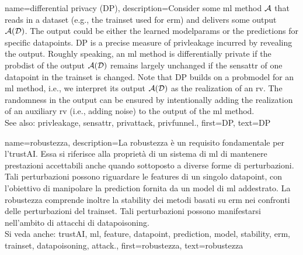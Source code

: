 {name={differential privacy (DP)},
  description={Consider some \gls{ml} method $\mathcal{A}$ 
  	that reads in a \gls{dataset} (e.g., the \gls{trainset} 
  	used for \gls{erm}) and delivers some output $\mathcal{A}(\mathcal{D})$. The output 
  	could be either the learned \glspl{modelparam} or the \glspl{prediction} for specific \glspl{datapoint}. 
  	DP is a precise measure of \gls{privleakage} incurred by revealing the 
  	output. Roughly speaking, an \gls{ml} method is differentially private if the \gls{probdist} 
  	of the output $\mathcal{A}(\mathcal{D})$ remains largely unchanged if the \gls{sensattr} 
  	of one \gls{datapoint} in the \gls{trainset} is changed. Note that DP 
  	builds on a \gls{probmodel} for an \gls{ml} method, i.e., we interpret its output $\mathcal{A}(\mathcal{D})$ 
  	as the \gls{realization} of an \gls{rv}. The randomness in the output can be ensured 
  	by intentionally adding the \gls{realization} of an auxiliary \gls{rv} (i.e., adding noise) to 
  	the output of the \gls{ml} method.
				\\ 
	See also: \gls{privleakage}, \gls{sensattr}, \gls{privattack}, \gls{privfunnel}.}, 
  first={DP}, 
  text={DP} 
}

{name={robustezza},
	description={La robustezza è un requisito fondamentale per l'\gls{trustAI}. Essa si 
	riferisce alla proprietà di un sistema di \gls{ml} di mantenere prestazioni accettabili anche quando 
	sottoposto a diverse forme di perturbazioni. Tali perturbazioni possono riguardare le \glspl{feature} 
		di un singolo \gls{datapoint}, con l’obiettivo di manipolare la \gls{prediction} fornita da un \gls{model}
		di \gls{ml} addestrato. 
		La robustezza comprende inoltre la \gls{stability} dei metodi basati su \gls{erm} nei confronti delle 
		perturbazioni del \gls{trainset}. Tali perturbazioni possono manifestarsi nell’ambito di attacchi di 
		\gls{datapoisoning}.
		\\ 
		Si veda anche: \gls{trustAI}, \gls{ml}, \gls{feature}, \gls{datapoint}, \gls{prediction}, \gls{model}, \gls{stability}, \gls{erm}, \gls{trainset}, \gls{datapoisoning}, \gls{attack}.}, 
	first={robustezza}, 
	text={robustezza} 
}

